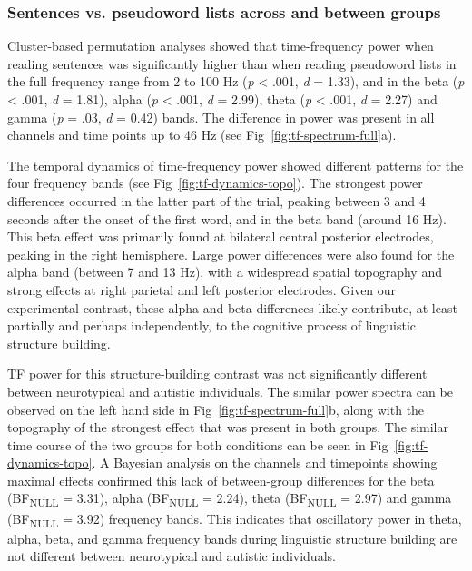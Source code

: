 \subsubsection{Sentences vs. pseudoword lists across and between groups}
Cluster-based permutation analyses showed that time-frequency power when reading sentences was significantly higher than when reading pseudoword lists in the full frequency range from 2 to 100 Hz (\textit{p} <  .001, \textit{d} = 1.33), and in the beta (\textit{p} <  .001, \textit{d} = 1.81), alpha (\textit{p} <  .001, \textit{d} = 2.99), theta (\textit{p} <  .001, \textit{d} = 2.27) and gamma (\textit{p} = .03, \textit{d} = 0.42) bands. The difference in power was present in all channels and time points up to 46 Hz (see Fig~\ref{fig:tf-spectrum-full}a).  

The temporal dynamics of time-frequency power showed different patterns for the four frequency bands (see Fig~\ref{fig:tf-dynamics-topo}). The strongest power differences occurred in the latter part of the trial, peaking between 3 and 4 seconds after the onset of the first word, and in the beta band (around 16 Hz). This beta effect was primarily found at bilateral central posterior electrodes, peaking in the right hemisphere. Large power differences were also found for the alpha band (between 7 and 13 Hz), with a widespread spatial topography and strong effects at right parietal and left posterior electrodes. Given our experimental contrast, these alpha and beta differences likely contribute, at least partially and perhaps independently, to the cognitive process of linguistic structure building. 

TF power for this structure-building contrast was not significantly different between neurotypical and autistic individuals. The similar power spectra can be observed on the left hand side in Fig~\ref{fig:tf-spectrum-full}b, along with the topography of the strongest effect that was present in both groups. The similar time course of the two groups for both conditions can be seen in Fig~\ref{fig:tf-dynamics-topo}. A Bayesian analysis on the channels and timepoints showing maximal effects confirmed this lack of between-group differences for the beta (BF\textsubscript{NULL} = 3.31), alpha (BF\textsubscript{NULL} = 2.24), theta (BF\textsubscript{NULL} = 2.97) and gamma (BF\textsubscript{NULL} = 3.92) frequency bands. This indicates that oscillatory power in theta, alpha, beta, and gamma frequency bands during linguistic structure building are not different between neurotypical and autistic individuals. 

